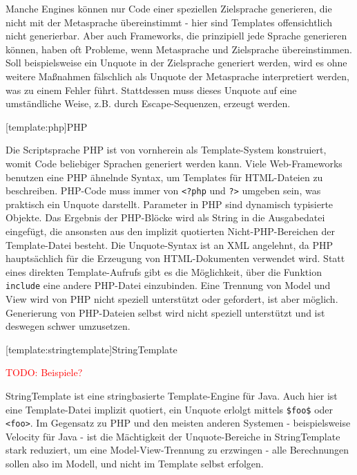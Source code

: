 \documentclass[11pt, a4paper, bibgerm]{scrbook}
\newcommand\icode[1]{\lstinline?#1?}
\newcommand\phpo{\lstinline+<?php+}
\newcommand\phpc{\lstinline+?>+}
\newcommand{\todo}[1]{
  \textcolor{red}{TODO: #1}
}
\newcommand\lsection{}
\begin{document}
Manche Engines können nur Code einer speziellen Zielsprache generieren,
die nicht mit der Metasprache übereinstimmt - hier sind Templates
offensichtlich nicht generierbar. Aber auch Frameworks, die prinzipiell
jede Sprache generieren können, haben oft Probleme, wenn Metasprache und
Zielsprache übereinstimmen. Soll beispielsweise ein Unquote in der
Zielsprache generiert werden, wird es ohne weitere Maßnahmen fälschlich
als Unquote der Metasprache interpretiert werden, was zu einem Fehler
führt. Stattdessen muss dieses Unquote auf eine umständliche Weise,
z.B. durch Escape-Sequenzen, erzeugt werden.

\lsection[template:php]{PHP}

Die Scriptsprache PHP ist von vornherein als Template-System
konstruiert, womit Code beliebiger Sprachen generiert werden kann. Viele
Web-Frameworks benutzen eine PHP ähnelnde Syntax, um Templates für
HTML-Dateien zu beschreiben. PHP-Code muss immer von \phpo{} und \phpc{}
umgeben sein, was praktisch ein Unquote darstellt. Parameter in PHP sind
dynamisch typisierte Objekte. Das Ergebnis der PHP-Blöcke wird als
String in die Ausgabedatei eingefügt, die ansonsten aus den implizit
quotierten Nicht-PHP-Bereichen der Template-Datei besteht. Die
Unquote-Syntax ist an XML angelehnt, da PHP hauptsächlich für die
Erzeugung von HTML-Dokumenten verwendet wird. Statt eines direkten
Template-Aufrufs gibt es die Möglichkeit, über die Funktion
\icode{include} eine andere PHP-Datei einzubinden. Eine Trennung von
Model und View wird von PHP nicht speziell unterstützt oder gefordert,
ist aber möglich. Generierung von PHP-Dateien selbst wird nicht speziell
unterstützt und ist deswegen schwer umzusetzen.

\lsection[template:stringtemplate]{StringTemplate}

\todo{Beispiele?}

StringTemplate\cite{StringTemplate} ist eine stringbasierte
Template-Engine für Java. Auch hier ist eine Template-Datei implizit
quotiert, ein Unquote erlolgt mittels \icode{$foo$} oder
\icode{<foo>}. Im Gegensatz zu PHP und den meisten anderen Systemen -
beispielsweise Velocity\cite{Velocity} für Java - ist
die Mächtigkeit der Unquote-Bereiche in StringTemplate stark reduziert,
um eine Model-View-Trennung zu erzwingen - alle Berechnungen sollen also
im Modell, und nicht im Template selbst erfolgen.
\end{document}
